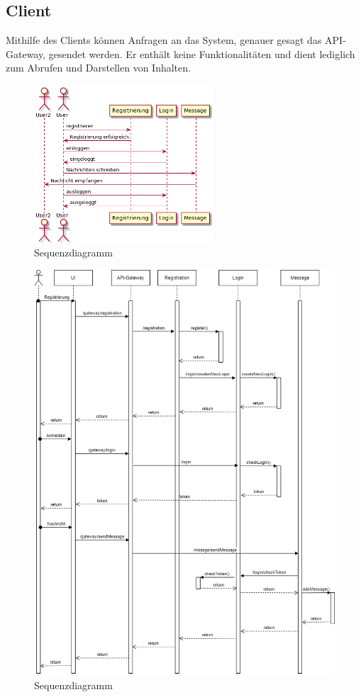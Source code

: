 \subsection{Client}
Mithilfe des Clients können Anfragen an das System, genauer gesagt das API-Gateway, gesendet werden. Er enthält keine Funktionalitäten und dient lediglich zum Abrufen und Darstellen von Inhalten.

\begin{figure}[bth] 
	\centering
	\includegraphics[width=0.6\textwidth]{Graphics/Sequenzdiagramm.png}
	\caption{Sequenzdiagramm}
\end{figure}

\begin{figure}[bth] 
	\centering
	\includegraphics[width=1\textwidth]{Graphics/test2.png}
	\caption{Sequenzdiagramm}
\end{figure}

